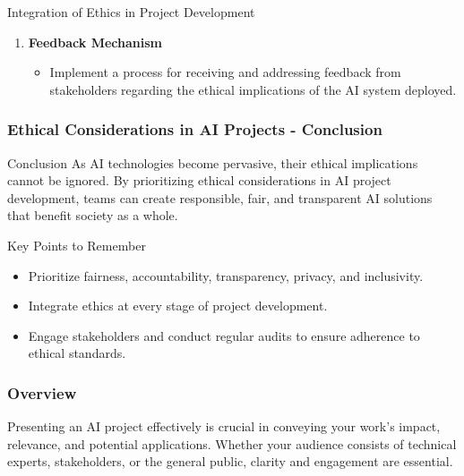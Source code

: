 \documentclass{beamer}
\begin{document}
\begin{frame}[fragile]
\begin{block}{Integration of Ethics in Project Development}
\begin{enumerate}
            \item \textbf{Feedback Mechanism}
                \begin{itemize}
                    \item Implement a process for receiving and addressing feedback from stakeholders regarding the ethical implications of the AI system deployed.
                \end{itemize}
        \end{enumerate}
    \end{block}
\end{frame}

\begin{frame}[fragile]
    \frametitle{Ethical Considerations in AI Projects - Conclusion}
    \begin{block}{Conclusion}
        As AI technologies become pervasive, their ethical implications cannot be ignored. By prioritizing ethical considerations in AI project development, teams can create responsible, fair, and transparent AI solutions that benefit society as a whole.
    \end{block}

    \begin{block}{Key Points to Remember}
        \begin{itemize}
            \item Prioritize fairness, accountability, transparency, privacy, and inclusivity.
            \item Integrate ethics at every stage of project development.
            \item Engage stakeholders and conduct regular audits to ensure adherence to ethical standards.
        \end{itemize}
    \end{block}
\end{frame}

\begin{frame}[fragile]
    \frametitle{Overview}
    Presenting an AI project effectively is crucial in conveying your work’s impact, relevance, and potential applications. Whether your audience consists of technical experts, stakeholders, or the general public, clarity and engagement are essential.
\end{frame}
\end{document}
